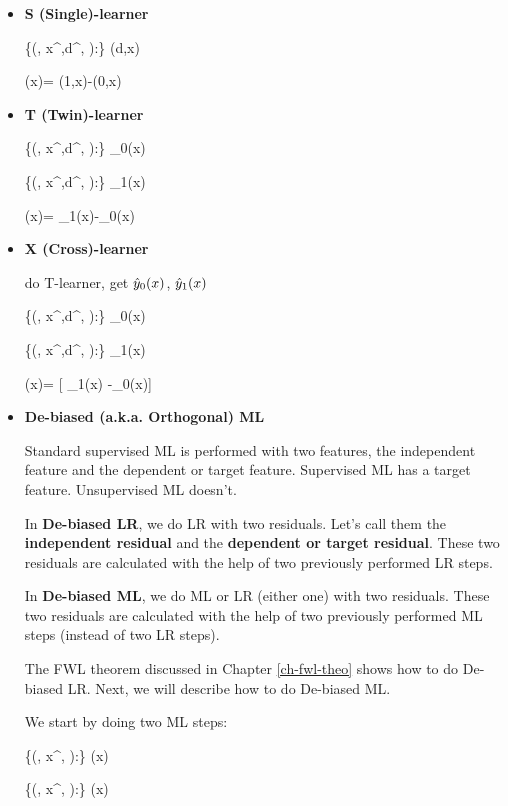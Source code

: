 \begin{itemize}
\item {\bf S (Single)-learner}

\beq
\{(\s, x^\s,d^\s,  ):\s\in \Sigma\}
\mlarr \haty(d,x)
\eeq

\beq
\delta(x)= \haty(1,x)-\haty(0,x)
\eeq

\item {\bf T (Twin)-learner}

\beq
\{(\s, x^\s,d^,  ):\s\in \Sigma\}
\mlarr \haty_0(x)
\eeq

\beq
\{(\s, x^\s,d^,  ):\s\in \Sigma\}
\mlarr \haty_1(x)
\eeq

\beq
\delta(x)= \haty_1(x)-\haty_0(x)
\eeq

\item {\bf X (Cross)-learner}

do T-learner, get ${\hat{y}}_0(x)$, ${\hat{y}}_1(x)$


\beq
\{(\s, x^\s,d^, ):\s\in \Sigma\}
\mlarr \caly_0(x)
\eeq

\beq
\{(\s, x^\s,d^, ):\s\in \Sigma\}
\mlarr \caly_1(x)
\eeq

\beq
\delta(x)= [
\caly_1(x) -\caly_0(x)]
\eeq

\item {\bf De-biased (a.k.a. Orthogonal) ML}

Standard supervised ML is performed with two features,
the independent feature and the dependent or target feature.
Supervised ML has a target feature. Unsupervised ML doesn't.


In {\bf De-biased LR}, we
do LR
with two residuals. Let's call them
the {\bf independent residual} and the
{\bf dependent or target residual}.
These  two residuals are calculated
with the help of two previously
performed LR steps.


In {\bf De-biased ML},
we do ML or LR (either one) with two residuals.
These  two residuals are calculated
with the help of two previously
performed ML steps (instead of two LR steps).

The FWL theorem
discussed in Chapter \ref{ch-fwl-theo}
shows how to do De-biased LR. Next,
we will describe how to 
do De-biased ML.

We start by doing two ML steps:

\beq
\{(\s, x^\s, ):\s\in \Sigma\}
\mlarr {}(x)
\eeq

\beq
\{(\s, x^\s, ):\s\in \Sigma\}
\mlarr \haty(x)
\eeq


\end{itemize}
